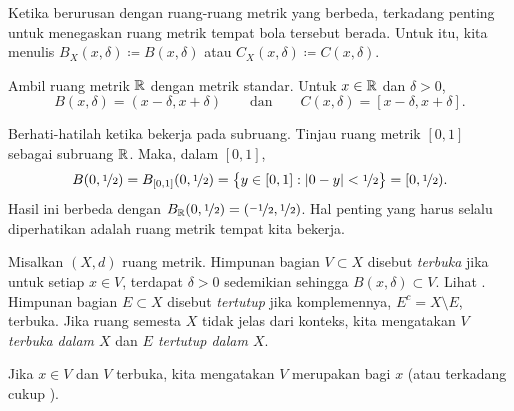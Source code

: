 Ketika berurusan dengan ruang-ruang metrik yang berbeda, terkadang
penting untuk menegaskan ruang metrik tempat bola tersebut berada.  Untuk itu, kita
menulis $B_X(x,\delta) \coloneqq B(x,\delta)$ atau $C_X(x,\delta) \coloneqq C(x,\delta)$.

\begin{example}
Ambil ruang metrik ${\mathbb{R}}$ dengan metrik standar.  Untuk
$x \in {\mathbb{R}}$ dan $\delta > 0$,
\begin{equation*}
B(x,\delta) = (x-\delta,x+\delta) \qquad \text{dan} \qquad
C(x,\delta) = [x-\delta,x+\delta] .
\end{equation*}
\end{example}

\begin{example}
Berhati-hatilah ketika bekerja pada subruang.  Tinjau
ruang metrik $[0,1]$ sebagai subruang ${\mathbb{R}}$.  Maka, dalam $[0,1]$,
\begin{equation*}
B(0,\nicefrac{1}{2}) = B_{[0,1]}(0,\nicefrac{1}{2})
= \bigl\{ y \in [0,1] : \lvert {0-y} \rvert < \nicefrac{1}{2} \bigr\}
= [0,\nicefrac{1}{2}) .
\end{equation*}
Hasil ini berbeda dengan $B_{{\mathbb{R}}}(0,\nicefrac{1}{2}) =
(\nicefrac{-1}{2},\nicefrac{1}{2})$.
Hal penting yang harus selalu diperhatikan adalah ruang metrik tempat kita
bekerja.
\end{example}

\begin{defn}
Misalkan $(X,d)$ ruang metrik.  Himpunan bagian $V \subset X$
disebut \emph{terbuka}
jika untuk setiap $x \in V$, terdapat $\delta > 0$ sedemikian sehingga
$B(x,\delta) \subset V$.  Lihat .  Himpunan bagian $E \subset X$ disebut
\emph{tertutup} jika komplemennya, $E^c = X \setminus E$, terbuka.
Jika ruang semesta $X$ tidak jelas dari konteks,
kita mengatakan \emph{$V$ terbuka dalam $X$} dan \emph{$E$ tertutup dalam $X$}.

Jika $x \in V$ dan $V$ terbuka, kita mengatakan
$V$ merupakan \emph{} bagi $x$ (atau
terkadang cukup \emph{}).
\end{defn}

\begin{myfigureht}
\caption{Himpunan terbuka dalam ruang metrik.  Perhatikan bahwa $\delta$ bergantung pada $x$.\label{fig:msopenset}}
\end{myfigureht}

